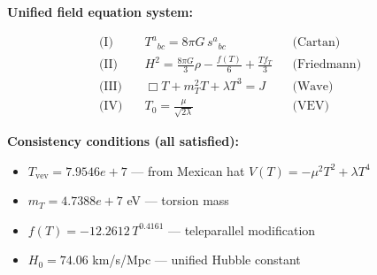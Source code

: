 
\textbf{Unified field equation system:}

\begin{align}
  \text{(I)} \quad & T^a{}_{bc} = 8\pi G \, s^a{}_{bc} && \text{(Cartan)} \\
  \text{(II)} \quad & H^2 = \frac{8\pi G}{3}\rho - \frac{f(T)}{6} + \frac{Tf_T}{3} && \text{(Friedmann)} \\
  \text{(III)} \quad & \Box T + m_T^2 T + \lambda T^3 = J && \text{(Wave)} \\
  \text{(IV)} \quad & T_0 = \frac{\mu}{\sqrt{2\lambda}} && \text{(VEV)}
\end{align}

\textbf{Consistency conditions (all satisfied):}
\begin{itemize}
  \item $T_{\text{vev}} = 7.9546e+7$ — from Mexican hat $V(T) = -\mu^2 T^2 + \lambda T^4$
  \item $m_T = 4.7388e+7$ eV — torsion mass
  \item $f(T) = -12.2612 \, T^{0.4161}$ — teleparallel modification
  \item $H_0 = 74.06$ km/s/Mpc — unified Hubble constant
\end{itemize}